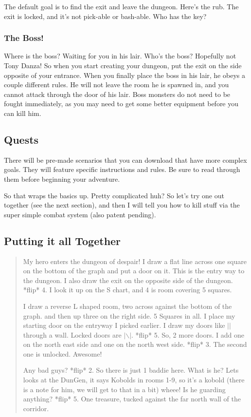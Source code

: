 \documentclass[a6paper,hidelinks]{article}
\begin{document}
The default goal is to find the exit and leave the dungeon. Here’s the rub. The exit is locked, and it’s not pick-able or bash-able. Who has the key?

\subsubsection{The Boss!}

 Where is the boss? Waiting for you in his lair. Who’s the boss? Hopefully not Tony Danza! So when you start creating your dungeon, put the exit on the side opposite of your entrance. When you finally place the boss in his lair, he obeys a couple different rules. He will not leave the room he is spawned in, and you cannot attack through the door of his lair. Boss monsters do not need to be fought immediately, as you may need to get some better equipment before you can kill him.

\subsection{Quests}
There will be pre-made scenarios that you can download that have more complex goals. They will feature specific instructions and rules. Be sure to read through them before beginning your adventure.

So that wraps the basics up. Pretty complicated huh? So let’s try one out together (see the next section),
and then I will tell you how to kill stuff via the super simple combat system (also patent pending).

\subsection{Putting it all Together}

\begin{quote}
My hero enters the dungeon of despair! I draw a flat line across one square on the bottom of the graph and put a
door on it. This is the entry way to the dungeon. I also draw the exit on the opposite side of the dungeon. *flip* 4. I look it up on the S chart, and 4 is room covering 5 squares.

I draw a reverse L shaped room, two across against the bottom of the graph. and then up three on the right side. 5 Squares in all. I place my starting door on the entryway I picked earlier. I draw my doors like $| |$ through a wall. Locked doors are $|\backslash|$.
*flip* 5. So, 2 more doors. I add one on the north east side and one on the north west side. *flip* 3. The second one is unlocked. Awesome!

Any bad guys? *flip* 2.  So there is just 1 baddie here. What is he? Lets looks at the DunGen, it says Kobolds in rooms 1-9, so it’s a kobold (there is a note for him, we will get to that in a bit) wheee!  Is he guarding anything? *flip* 5.  One treasure, tucked against the far north wall of the corridor.

\end{quote}
\end{document}
